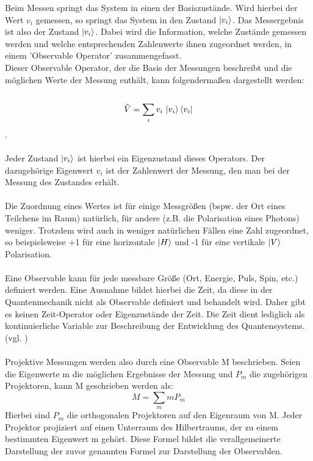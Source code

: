 Beim Messen springt das System in einen der Basiszustände. 
Wird hierbei der Wert $v_i$ gemessen, so springt das System in den Zustand $\ket{v_i}$. Das Messergebnis ist also der Zustand $\ket{v_i}$. 
Dabei wird die Information, welche Zustände gemessen werden und welche entsprechenden Zahlenwerte ihnen zugeordnet werden, in einem 'Observable Operator' zusammengefasst. \\
Dieser Observable Operator, der die Basis der Messungen beschreibt und die möglichen Werte der Messung enthält, kann folgendermaßen dargestellt werden: \\
\\
\begin{equation}
\hat{V} = \sum_i v_i \, \ket{v_i}\bra{v_i}
\end{equation}.
\\ 
\\
Jeder Zustand $\ket{v_i}$ ist hierbei ein Eigenzustand dieses Operators. Der dazugehörige Eigenwert $v_i$ ist der Zahlenwert der Messung, den man bei der Messung des Zustandes erhält. \\ 
\\
Die Zuordnung eines Wertes ist für einige Messgrößen (bspw. der Ort eines Teilchens im Raum) natürlich, für andere (z.B. die Polarisation eines Photons) weniger. Trotzdem wird auch in weniger natürlichen Fällen  eine Zahl zugeordnet, so beispielsweise +1 für eine horizontale $\ket{H}$ und -1 für eine vertikale $\ket{V}$ Polarisation. \\
\\
Eine Observable kann für jede messbare Größe (Ort, Energie, Puls, Spin, etc.) definiert werden. Eine Ausnahme bildet hierbei die Zeit, da diese in der Quantenmechanik nicht als Observable definiert und behandelt wird.
Daher gibt es keinen Zeit-Operator oder Eigenzustände der Zeit. Die Zeit dient lediglich als kontinuierliche Variable zur Beschreibung der Entwicklung des Quantensystems. 
(vgl. \cite[Ch. 1.9.1]{lvosvsky_quantum_2018})
\\
\\
Projektive Messungen werden also durch eine Observable M beschrieben. Seien die Eigenwerte m die möglichen Ergebnisse der Messung und $P_m$ die zugehörigen Projektoren, kann M geschrieben werden als:
\begin{equation}
    M = \sum_m mP_m
\end{equation}
Hierbei sind $P_m$ die orthogonalen Projektoren auf den Eigenraum von M. Jeder Projektor projiziert auf einen Unterraum des Hilbertraums, der zu einem bestimmten Eigenwert m gehört. Diese Formel bildet die verallgemeinerte Darstellung der zuvor genannten Formel zur Darstellung der Observablen. \\ %
